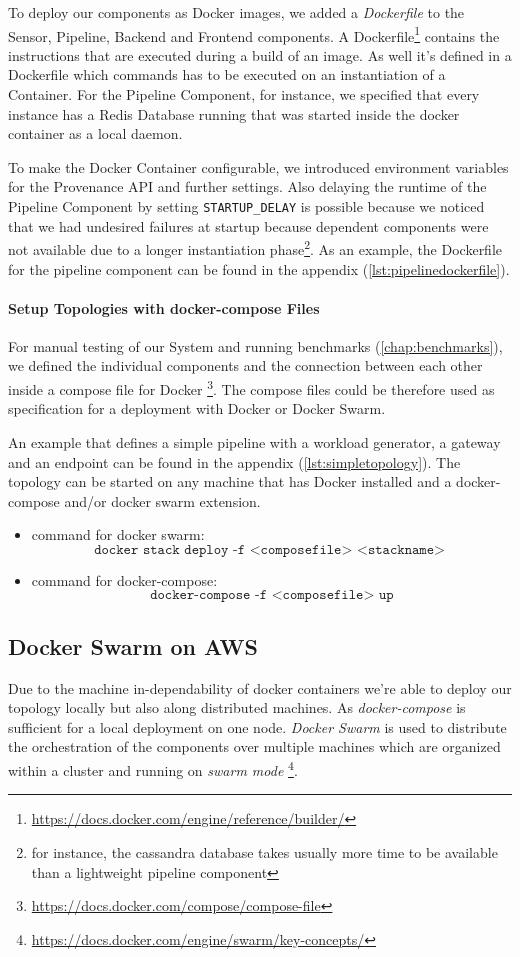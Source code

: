 To deploy our components as Docker images, we added a \emph{Dockerfile} to the Sensor, Pipeline, Backend and Frontend components. A Dockerfile\footnote{\url{https://docs.docker.com/engine/reference/builder/}} contains the instructions that are executed during a build of an image. As well it's defined in a Dockerfile which commands has to be executed on an instantiation of a Container. For the Pipeline Component, for instance, we specified that every instance has a Redis Database running that was started inside the docker container as a local daemon.

To make the Docker Container configurable, we introduced environment variables for the Provenance API and further settings. Also delaying the runtime of the Pipeline Component by setting \texttt{STARTUP\_DELAY} is possible because we noticed that we had undesired failures at startup because dependent components were not available due to a longer instantiation phase\footnote{for instance, the cassandra database takes usually more time to be available than a lightweight pipeline component}. As an example, the Dockerfile for the pipeline component can be found in the appendix (\ref{lst:pipelinedockerfile}).

\paragraph*{Setup Topologies with docker-compose Files} 
For manual testing of our System and running benchmarks (\ref{chap:benchmarks}), we defined the individual components and the connection between each other inside a compose file for Docker \footnote{\url{https://docs.docker.com/compose/compose-file}}. The compose files could be therefore used as specification for a deployment with Docker or Docker Swarm.

An example that defines a simple pipeline with a workload generator, a gateway and an endpoint can be found in the appendix (\ref{lst:simpletopology}).
The topology can be started on any machine that has Docker installed and a docker-compose and/or docker swarm extension.

\begin{itemize}
	\item command for docker swarm: 
		$$\texttt{docker stack deploy -f <composefile> <stackname> }$$
	\item command for docker-compose: 
		$$\texttt{docker-compose -f <composefile> up} $$
\end{itemize}

\subsection{Docker Swarm on AWS}
Due to the machine in-dependability of docker containers we're able to deploy our topology locally but also along distributed machines.
As \emph{docker-compose} is sufficient for a local deployment on one node. \emph{Docker Swarm} is used to distribute the orchestration of the components over multiple machines which are organized within a cluster and running on \emph{swarm mode} \footnote{\url{https://docs.docker.com/engine/swarm/key-concepts/}}.

